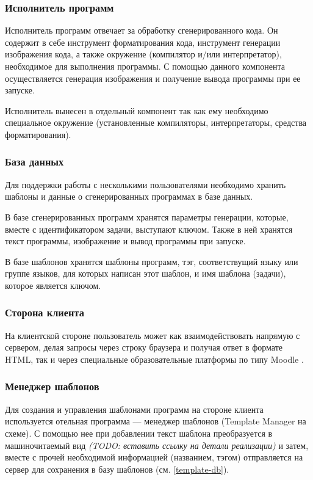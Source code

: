 \subsubsection{Исполнитель программ}
Исполнитель программ отвечает за обработку сгенерированного
кода. Он содержит в себе инструмент форматирования кода, инструмент генерации изображения
кода, а также окружение (компилятор и/или интерпретатор), необходимое для выполнения
программы. С помощью данного компонента осуществляется генерация изображения и получение
вывода программы при ее запуске.

Исполнитель вынесен в отдельный компонент так как ему необходимо специальное окружение
(установленные компиляторы, интерпретаторы, средства форматирования).

\subsubsection{База данных}
\label{db-model}
Для поддержки работы с несколькими пользователями необходимо хранить шаблоны и данные о
сгенерированных программах в базе данных.

В базе сгенерированных программ хранятся параметры генерации,
которые, вместе с
идентификатором задачи, выступают ключом. Также в ней хранятся текст программы,
изображение и вывод программы при запуске.

\label{template-db} В базе шаблонов хранятся шаблоны программ, тэг, соответствущий языку или группе
языков, для которых написан этот шаблон, и имя шаблона (задачи), которое является ключом.

\subsubsection{Сторона клиента}
На клиентской стороне пользователь может как взаимодействовать напрямую с сервером,
делая запросы через строку браузера и получая ответ в формате HTML, так и через
специальные образовательные платформы по типу Moodle \cite*{moodle}.

\subsubsection{Менеджер шаблонов}
Для создания и управления шаблонами программ на стороне клиента используется отельная
программа --- менеджер шаблонов (Template Manager на схеме). С помощью нее при добавлении текст шаблона
преобразуется в машиночитаемый вид \textit{(TODO: вставить ссылку на детали реализации)}
и затем, вместе с прочей необходимой информацией (названием, тэгом) отправляется на сервер
для сохранения в базу шаблонов (см. \ref{template-db}).
